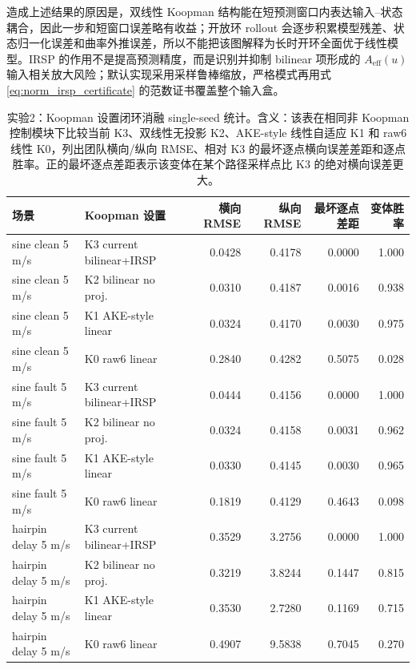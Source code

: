 \documentclass[twocolumn,3p,times,procedia]{elsarticle}
\newif\ifNRReview
\newcommand{\reviewblock}[1]{\ifNRReview\par\smallskip\noindent\begingroup\setlength{\fboxsep}{4pt}\colorbox{yellow!35}{\parbox{0.96\linewidth}{\footnotesize\textbf{当前不足：} #1}}\endgroup\par\smallskip\fi}
\begin{document}
造成上述结果的原因是，双线性 Koopman 结构能在短预测窗口内表达输入--状态耦合，因此一步和短窗口误差略有收益；开放环 rollout 会逐步积累模型残差、状态归一化误差和曲率外推误差，所以不能把该图解释为长时开环全面优于线性模型。IRSP 的作用不是提高预测精度，而是识别并抑制 bilinear 项形成的 $A_{\mathrm{eff}}(u)$ 输入相关放大风险；默认实现采用采样鲁棒缩放，严格模式再用式 \eqref{eq:norm_irsp_certificate} 的范数证书覆盖整个输入盒。
\reviewblock{到当前 MPC 主配置 $H=12$ 时，三类模型的 95\% 置信区间高度重叠，因此最终稿不应写“长时开环全面优于线性模型”。本轮已将 IRSP 右图从 6 状态离线 surrogate 更新为当前 31 维 lifted 双线性 Koopman 模型矩阵审计；仍需注意该证据是 96 个训练输入采样点上的采样鲁棒证据，不等同于整个连续输入盒上的严格全局证书。}

\begin{table}[!tbp]
\centering
\caption{实验2：Koopman 设置闭环消融 single-seed 统计。含义：该表在相同非 Koopman 控制模块下比较当前 K3、双线性无投影 K2、AKE-style 线性自适应 K1 和 raw6 线性 K0，列出团队横向/纵向 RMSE、相对 K3 的最坏逐点横向误差差距和逐点胜率。正的最坏逐点差距表示该变体在某个路径采样点比 K3 的绝对横向误差更大。}
\label{tab:e9_koopman_dim}
\footnotesize
\begin{tabular}{llrrrr}
\toprule
场景 & Koopman 设置 & 横向 RMSE & 纵向 RMSE & 最坏逐点差距 & 变体胜率\\
\midrule
sine clean 5 m/s & K3 current bilinear+IRSP & 0.0428 & 0.4178 & 0.0000 & 1.000\\
sine clean 5 m/s & K2 bilinear no proj. & 0.0310 & 0.4187 & 0.0016 & 0.938\\
sine clean 5 m/s & K1 AKE-style linear & 0.0324 & 0.4170 & 0.0030 & 0.975\\
sine clean 5 m/s & K0 raw6 linear & 0.2840 & 0.4282 & 0.5075 & 0.028\\
sine fault 5 m/s & K3 current bilinear+IRSP & 0.0444 & 0.4156 & 0.0000 & 1.000\\
sine fault 5 m/s & K2 bilinear no proj. & 0.0324 & 0.4158 & 0.0031 & 0.962\\
sine fault 5 m/s & K1 AKE-style linear & 0.0330 & 0.4145 & 0.0030 & 0.965\\
sine fault 5 m/s & K0 raw6 linear & 0.1819 & 0.4129 & 0.4643 & 0.098\\
hairpin delay 5 m/s & K3 current bilinear+IRSP & 0.3529 & 3.2756 & 0.0000 & 1.000\\
hairpin delay 5 m/s & K2 bilinear no proj. & 0.3219 & 3.8244 & 0.1447 & 0.815\\
hairpin delay 5 m/s & K1 AKE-style linear & 0.3530 & 2.7280 & 0.1169 & 0.715\\
hairpin delay 5 m/s & K0 raw6 linear & 0.4907 & 9.5838 & 0.7045 & 0.270\\
\bottomrule
\end{tabular}
\end{table}
\end{document}

